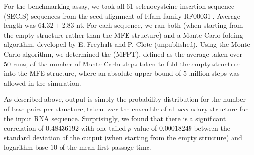 For the benchmarking assay, we took all 61 selenocysteine insertion sequence
(SECIS) sequences from the seed alignment of Rfam family RF00031
\cite{Gardner.nar11}. Average length was $64.32 \pm 2.83$ nt.
For each sequence, we ran both \fftbor (when starting
from the empty structure rather than the MFE structure) and a Monte Carlo
folding algorithm, developed by E. Freyhult and P. Clote (unpublished).
Using the Monte Carlo algorithm, we
determined the \mfpt (MFPT), defined as the average
taken over 50 runs, of the number of Monte Carlo steps taken to fold
the empty structure into the MFE structure, where an absolute upper bound
of 5 million steps was allowed in the simulation.

As described above, \fftbor output is simply
the probability distribution
for the number of base pairs per structure, taken over the ensemble
of all secondary structure for the input RNA
sequence. Surprisingly, we found that there is a significant
correlation of  $0.48436192$ with one-tailed
$p$-value of $0.00018249$ between the
standard deviation of the \fftbor output (when starting from the
empty structure) and logarithm base $10$ of the mean first passage time.

